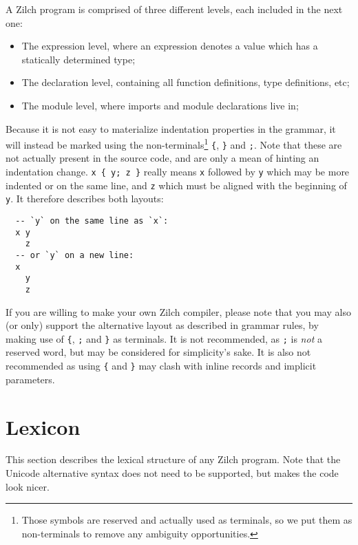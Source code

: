 A Zilch program is comprised of three different levels, each included in the next one:
\begin{itemize}
	\item The expression level, where an expression denotes a value which has a statically determined type;
	\item The declaration level, containing all function definitions, type definitions, etc;
	\item The module level, where imports and module declarations live in;
\end{itemize}

\noindent Because it is not easy to materialize indentation properties in the grammar, it will instead be marked using the non-terminals\footnote{Those symbols are reserved and actually used as terminals, so we put them as non-terminals to remove any ambiguity opportunities.} \texttt{\{}, \texttt{\}} and \texttt{;}.
Note that these are not actually present in the source code, and are only a mean of hinting an indentation change.
\texttt{x \{ y; z \}} really means \texttt{x} followed by \texttt{y} which may be more indented or on the same line, and \texttt{z} which must be aligned with the beginning of \texttt{y}.
It therefore describes both layouts:

\noindent\begin{verbatim}
  -- `y` on the same line as `x`:
  x y
    z
  -- or `y` on a new line:
  x
    y
    z
\end{verbatim}
\vspace*{\baselineskip}

\begin{warningbox}
	If you are willing to make your own Zilch compiler, please note that you may also (or only) support the alternative layout as described in grammar rules, by making use of \verb|{|, \verb|;| and \verb|}| as terminals.
	It is not recommended, as \verb|;| is \textit{not} a reserved word, but may be considered for simplicity's sake.
	It is also not recommended as using \verb|{| and \verb|}| may clash with inline records and implicit parameters.
\end{warningbox}

\section{Lexicon}\label{sec:zilch-grammar-lexical}

This section describes the lexical structure of any Zilch program.
Note that the Unicode alternative syntax does not need to be supported, but makes the code look nicer.

